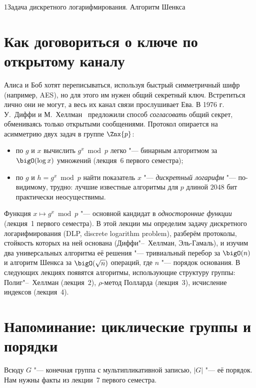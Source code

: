 \begin{lecture}{1}{Задача дискретного логарифмирования. Алгоритм Шенкса}

\section{Как договориться о ключе по открытому каналу}

Алиса и Боб хотят переписываться, используя быстрый симметричный шифр (например, AES), но для
этого им нужен общий секретный ключ. Встретиться лично они не могут, а весь их канал связи
прослушивает Ева. В 1976 г. У.~Диффи и М.~Хеллман~\cite{diffie-hellman} предложили способ
\emph{согласовать} общий секрет, обмениваясь только открытыми сообщениями. Протокол опирается
на асимметрию двух задач в группе $\Znx{p}$:
\begin{itemize}
  \item по $g$ и $x$ вычислить $g^x \bmod p$ легко "--- бинарным алгоритмом за $\bigO(\log x)$
    умножений (лекция~6 первого семестра);
  \item по $g$ и $h = g^x \bmod p$ найти показатель $x$ "--- \emph{дискретный логарифм} "---
    по-видимому, трудно: лучшие известные алгоритмы для $p$ длиной $2048$ бит практически
    неосуществимы.
\end{itemize}

Функция $x \mapsto g^x \bmod p$ "--- основной кандидат в \emph{односторонние функции}
(лекция~1 первого семестра). В этой лекции мы определим задачу дискретного логарифмирования
(DLP, discrete logarithm problem), разберём протоколы, стойкость которых на ней основана
(Диффи"--~Хеллман, Эль-Гамаль), и изучим два универсальных алгоритма её решения "---
тривиальный перебор за $\bigO(n)$ и алгоритм Шенкса за $\bigO(\sqrt n)$ операций, где $n$ "---
порядок основания. В следующих лекциях появятся алгоритмы, использующие структуру группы:
Полиг"--~Хеллман (лекция~2), $\rho$-метод Полларда (лекция~3), исчисление индексов (лекция~4).

\section{Напоминание: циклические группы и порядки}

Всюду $G$ "--- конечная группа с мультипликативной записью, $|G|$ "--- её порядок. Нам нужны
факты из лекции~7 первого семестра.


\end{lecture}
